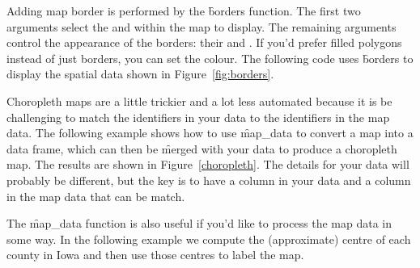 Adding map border is performed by the \f{borders} function.  The first two arguments select the  and  within the map to display.  The remaining arguments control the appearance of the borders: their  and .  If you'd prefer filled polygons instead of just borders, you can set the  colour.  The following code uses \f{borders} to display the spatial data shown in Figure~\ref{fig:borders}.

% 
% 


Choropleth maps are a little trickier and a lot less automated because it is be challenging to match the identifiers in your data to the identifiers in the map data. The following example shows how to use \f{map_data} to convert a map into a data frame, which can then be \f{merge}d with your data to produce a choropleth map. The results are shown in Figure~\ref{choropleth}. The details for your data will probably be different, but the key is to have a column in your data and a column in the map data that can be match.

% 
% 


The \f{map_data} function is also useful if you'd like to process the map data in some way.  In the following example we compute the (approximate) centre of each county in Iowa and then use those centres to label the map.

